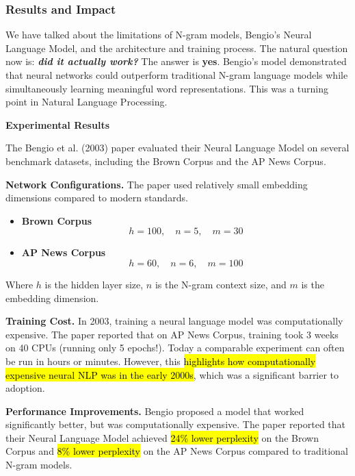\subsubsection{Results and Impact}\label{sec:results-and-impact}

We have talked about the limitations of N-gram models, Bengio's Neural Language Model, and the architecture and training process. The natural question now is: \emph{\textbf{did it actually work?}} The answer is \textbf{yes}. Bengio's model demonstrated that neural networks could outperform traditional N-gram language models while simultaneously learning meaningful word representations. This was a turning point in Natural Language Processing.

\highspace
\begin{flushleft}
    \textcolor{Green3}{ \textbf{Experimental Results}}
\end{flushleft}
The Bengio et al. (2003) paper evaluated their Neural Language Model on several benchmark datasets, including the Brown Corpus and the AP News Corpus.

\highspace
\textcolor{Green3}{ \textbf{Network Configurations.}} The paper used relatively small embedding dimensions compared to modern standards.
\begin{itemize}
    \item \textbf{Brown Corpus}
    \begin{equation*}
        h = 100, \quad n = 5, \quad m = 30
    \end{equation*}
    \item \textbf{AP News Corpus}
    \begin{equation*}
        h = 60, \quad n = 6, \quad m = 100
    \end{equation*}
\end{itemize}
Where $h$ is the hidden layer size, $n$ is the N-gram context size, and $m$ is the embedding dimension.

\highspace
\textcolor{Red2}{ \textbf{Training Cost.}} In 2003, training a neural language model was computationally expensive. The paper reported that on AP News Corpus, training took 3 weeks on 40 CPUs (running only 5 epochs!).\cite{bengio2003neural} Today a comparable experiment can often be run in hours or minutes. However, this \hl{highlights how computationally expensive neural NLP was in the early 2000s}, which was a significant barrier to adoption.

\highspace
\textcolor{Green3}{ \textbf{Performance Improvements.}} Bengio proposed a model that worked significantly better, but was computationally expensive. The paper reported that their Neural Language Model achieved \hl{24\% lower perplexity} on the Brown Corpus and \hl{8\% lower perplexity} on the AP News Corpus compared to traditional N-gram models.


